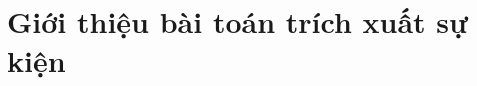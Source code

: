 \chapter{Giới thiệu bài toán trích xuất sự kiện}

\ifpdf
    \graphicspath{{1\_introduction/figures/PNG/}{1\_introduction/figures/PDF/}{1\_introduction/figures/}}
\else
    \graphicspath{{1\_introduction/figures/EPS/}{1\_introduction/figures/}}
\fi











